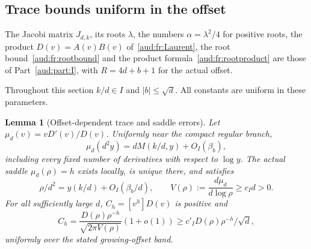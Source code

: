 \documentclass[11pt,a4paper]{article}
\numberwithin{equation}{section}
\newtheorem{lemma}[theorem]{Lemma}
\begin{document}
\subsection{Trace bounds uniform in the offset}
The Jacobi matrix $J_{d,k}$, its roots $\lambda$, the numbers $\alpha=\lambda^2/4$ for positive roots, the product $D(v)=A(v)B(v)$ of~\eqref{aud:fr:Laurent}, the root bound~\eqref{aud:fr:rootbound} and the product formula~\eqref{aud:fr:rootproduct} are those of Part~\ref{aud:part:I}, with $R=4d+b+1$ for the actual offset.

Throughout this section $k/d\in I$ and $|b|\le\sqrt d$. All constants are uniform in these parameters.

\begin{lemma}[Offset-dependent trace and saddle errors]\label{aud:go:trace}
Let $\mu_d(v)=vD'(v)/D(v)$. Uniformly near the compact regular branch,
\begin{equation}\label{aud:go:meanerror}
 \mu_d(d^2y)=dM(k/d,y)+O_I(\beta_b),
\end{equation}
including every fixed number of derivatives with respect to $\log y$. The actual saddle $\mu_d(\rho)=h$ exists locally, is unique there, and satisfies
\begin{equation}\label{aud:go:saddlerate}
 \rho/d^2=y(k/d)+O_I(\beta_b/d),\qquad
 V(\rho):=\frac{d\mu_d}{d\log\rho}\ge c_I d>0.
\end{equation}
For all sufficiently large $d$, $C_h=[v^h]D(v)$ is positive and
\begin{equation}\label{aud:go:Ch}
 C_h=\frac{D(\rho)\rho^{-h}}{\sqrt{2\pi V(\rho)}}(1+o(1))
 \ge c'_I D(\rho)\rho^{-h}/\sqrt d,
\end{equation}
uniformly over the stated growing-offset band.
\end{lemma}
\end{document}
